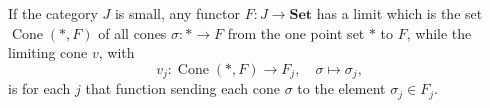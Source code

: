 If the category $J$ is small, any functor $F : J \to \mathbf{Set}$ has a limit which is the set $\operatorname{Cone}(*, F)$ of all cones $\sigma : * \to F$ from the one point set $*$ to $F$, while the limiting cone $v$, with
$$v_j : \operatorname{Cone}(*, F) \to F_j, \quad \sigma \mapsto \sigma_j,$$
is for each $j$ that function sending each cone $\sigma$ to the element $\sigma_j \in F_j$.
